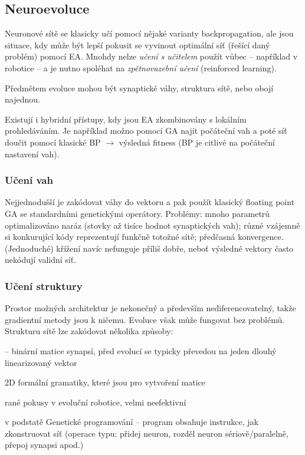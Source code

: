 \subsection{Neuroevoluce}
Neuronové sítě se klasicky učí pomocí nějaké varianty backpropagation, ale jsou situace, kdy může být lepší pokusit se vyvinout optimální síť (řešící daný problém) pomocí EA. Mnohdy nelze \textit{učení s učitelem} použít vůbec -- například v robotice -- a je nutno spoléhat na \textit{zpětnovazební učení} (reinforced learning).

Předmětem evoluce mohou být synaptické váhy, struktura sítě, nebo obojí najednou. 

Existují i hybridní přístupy, kdy jsou EA zkombinovány s lokálním prohledáváním. Je například možno pomocí GA najít počáteční vah a poté síť doučit pomocí klasické BP $\rightarrow$ výsledná fitness (BP je citlivé na počáteční nastavení vah).

\subsubsection{Učení vah}
Nejjednodušší je zakódovat váhy do vektoru a pak použít klasický floating point GA se standardními genetickými operátory. Problémy: mnoho parametrů optimalizováno naráz (stovky až tisíce hodnot synaptických vah); různé vzájemně si konkurující kódy reprezentují funkčně totožné sítě; předčasná konvergence. (Jednoduché) křížení navíc nefunguje příliš dobře, neboť výsledné vektory často nekódují validní síť.

\subsubsection{Učení struktury}
Prostor možných architektur je nekonečný a především nediferencovatelný, takže gradientní metody jsou k ničemu. Evoluce však může fungovat bez problémů.
Strukturu sítě lze zakódovat několika způsoby:
\begin{description}
	\leftskip 20pt
	\setlength{\itemsep}{0pt}
	\item[přímé kódování] -- binární matice synapsí, před evolucí se typicky převedou na jeden dlouhý linearizovaný vektor 
	\item[gramatické kódování] 2D formální gramatiky, které jsou  pro vytvoření matice	
	\item[růst sítě ve 2D] rané pokusy v evoluční robotice, velmi neefektivní
	\item[celulární kódování] v podstatě Genetické programování -- program obsahuje instrukce, jak zkonstruovat síť (operace typu: přidej neuron, rozděl neuron sériově/paralelně, přepoj synapsi apod.)
\end{description}

